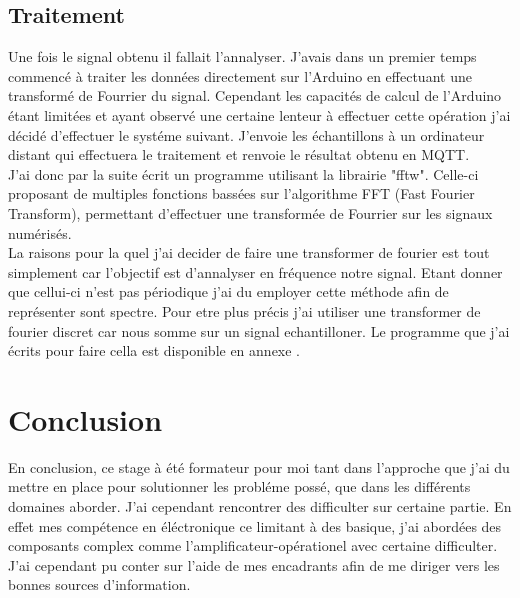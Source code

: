 \documentclass[12pt,french,a4paper]{article}
\begin{document}
\subsection{Traitement}

Une fois le signal obtenu il fallait l'annalyser. J'avais dans un premier temps commencé à traiter les données directement sur l'Arduino en effectuant une transformé de Fourrier du signal. Cependant les capacités de calcul de l'Arduino étant limitées et ayant observé une certaine lenteur à effectuer cette opération j'ai décidé d'effectuer le systéme suivant. J'envoie les échantillons à un ordinateur distant qui effectuera le traitement et renvoie le résultat obtenu en MQTT.\\
J'ai donc par la suite écrit un programme utilisant la librairie "fftw". Celle-ci proposant de multiples fonctions bassées sur l'algorithme FFT (Fast Fourier Transform), permettant d'effectuer une transformée de Fourrier sur les signaux numérisés.\\
La raisons pour la quel j'ai decider de faire une transformer de fourier est tout simplement car l'objectif est d'annalyser en fréquence notre signal. Etant donner que cellui-ci n'est pas périodique j'ai du employer cette méthode afin de représenter sont spectre. Pour etre plus précis j'ai utiliser une transformer de fourier discret car nous somme sur un signal echantilloner. 
Le programme que j'ai écrits pour faire cella est disponible en annexe .  


\section{Conclusion}
En conclusion, ce stage à été formateur pour moi tant dans l'approche que j'ai du mettre en place pour solutionner les probléme possé, que dans les différents domaines aborder. J'ai cependant rencontrer des difficulter sur certaine partie. En effet mes compétence en éléctronique ce limitant à des basique, j'ai abordées des composants complex comme l'amplificateur-opérationel avec certaine difficulter. J'ai cependant pu conter sur l'aide de mes encadrants afin de me diriger vers les bonnes sources d'information.


\listoffigures
%
\end{document}
